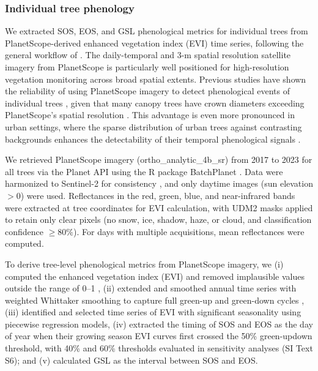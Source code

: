 \subsubsection{Individual tree phenology}

We extracted SOS, EOS, and GSL phenological metrics for individual trees from PlanetScope-derived enhanced vegetation index (EVI) time series, following the general workflow of \citet{Song2025SRS}. The daily-temporal and 3-m spatial resolution satellite imagery from PlanetScope is particularly well positioned for high-resolution vegetation monitoring across broad spatial extents. Previous studies have shown the reliability of using PlanetScope imagery to detect phenological events of individual trees \citep{Moon2021RSE,Song2025SRS,Zhao2022RSE}, given that many canopy trees have crown diameters exceeding PlanetScope’s spatial resolution \citep{Dixon2025UFUG,Liu2023SciAdv,zhang2025naturecities}. This advantage is even more pronounced in urban settings, where the sparse distribution of urban trees against contrasting backgrounds enhances the detectability of their temporal phenological signals \citep{Liu2023SciAdv,Neyns2024UFUG}.

We retrieved PlanetScope imagery (ortho\_analytic\_4b\_sr) from 2017 to 2023 for all trees via the Planet API using the R package BatchPlanet \citep{Song2026}. Data were harmonized to Sentinel-2 for consistency \citep{kington_scene_2022}, and only daytime images (sun elevation $> 0$) were used. Reflectances in the red, green, blue, and near-infrared bands were extracted at tree coordinates for EVI calculation, with UDM2 masks applied to retain only clear pixels (no snow, ice, shadow, haze, or cloud, and classification confidence $\geq 80\%$). For days with multiple acquisitions, mean reflectances were computed.

To derive tree-level phenological metrics from PlanetScope imagery, we (i) computed the enhanced vegetation index (EVI) and removed implausible values outside the range of 0–1 \citep{huete_overview_2002}, (ii) extended and smoothed annual time series with weighted Whittaker smoothing to capture full green-up and green-down cycles \citep{kong_robust_2019}, (iii) identified and selected time series of EVI with significant seasonality using piecewise regression models, (iv) extracted the timing of SOS and EOS as the day of year when their growing season EVI curves first crossed the 50\% green-up\/down threshold, with 40\% and 60\% thresholds evaluated in sensitivity analyses (SI Text S6); and (v) calculated GSL as the interval between SOS and EOS.

